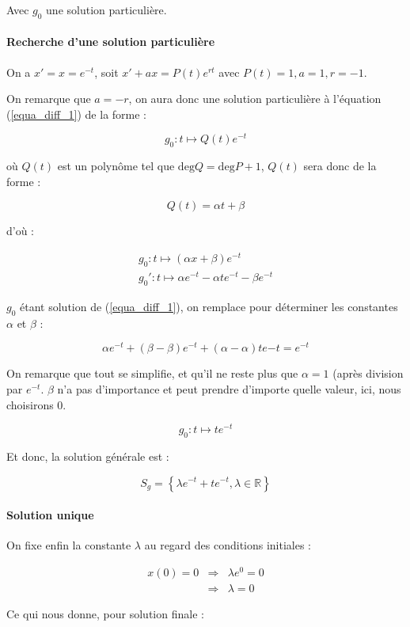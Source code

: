 \documentclass[a4paper, 11pt]{report} %
\newcommand{\R}{\mathbb{R}}
\renewcommand{\mapsto}{\longmapsto}
\begin{document}
Avec $g_0$ une solution particulière.

\paragraph{Recherche d'une solution particulière}
On a $x' = x = e^{-t}$, soit $x' + ax = P(t)e^{rt}$ avec $P(t) = 1, a = 1, r = -1$.

On remarque que $a=-r$, on aura donc une solution particulière à l'équation (\ref{equa_diff_1}) de la forme :

\[ g_0 : t \mapsto Q(t)e^{-t} \]

où $Q(t)$ est un polynôme tel que $\mathrm{deg}Q = \mathrm{deg}P + 1$, $Q(t)$ sera donc de la forme :

\[ Q(t) = \alpha t + \beta \]

d'où :

\[
\begin{array}{c}
g_0 : t\mapsto (\alpha x + \beta)e^{-t}\\
g_0' : t \mapsto \alpha e^{-t} - \alpha te^{-t} - \beta e^{-t}
\end{array}
\]

$g_0$ étant solution de (\ref{equa_diff_1}), on remplace pour déterminer les constantes $\alpha$ et $\beta$ :

\[
\alpha e^{-t} + (\beta - \beta)e^{-t} + (\alpha - \alpha)te{-t} = e^{-t}
\]

On remarque que tout se simplifie, et qu'il ne reste plus que $\alpha = 1$ (après division par $e^{-t}$.
$\beta$ n'a pas d'importance et peut prendre d'importe quelle valeur, ici, nous choisirons 0.

\[ g_0 : t\mapsto te^{-t} \]

Et donc, la solution générale est :

\[ S_g = \left\{\lambda e^{-t} + te^{-t}, \lambda\in\R\right\} \]

\paragraph{Solution unique}
On fixe enfin la constante $\lambda$ au regard des conditions initiales :

\begin{eqnarray*}
    x(0) = 0 & \Rightarrow & \lambda e^0 = 0\\
    & \Rightarrow & \lambda = 0
\end{eqnarray*}

Ce qui nous donne, pour solution finale :
\end{document}
